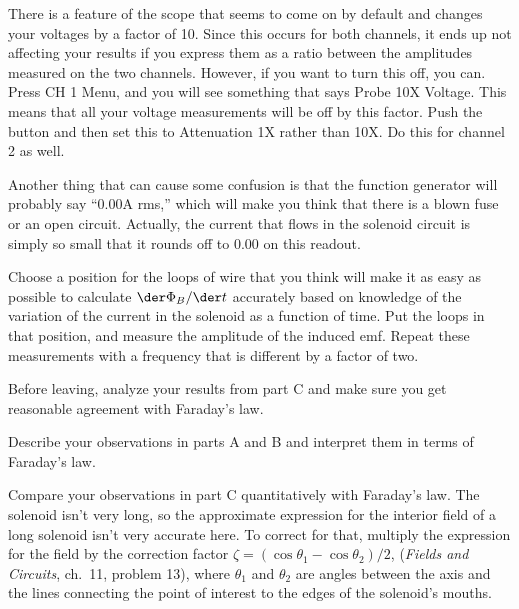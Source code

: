 There is a feature of the scope that seems to come on by
default and changes your voltages by a factor of 10. Since this
occurs for both channels, it ends up not affecting your results
if you express them as a ratio between the amplitudes measured
on the two channels. However, if you want to turn this off, you can.
Press CH 1 Menu, and you will see something that
says Probe 10X Voltage. This means that all your voltage measurements
will be off by this factor. Push the button and then set this to
Attenuation 1X rather than 10X. Do this for channel 2 as well.

Another thing that can cause some confusion is that the function generator
will probably say ``0.00A rms,'' which will make you think that there is
a blown fuse or an open circuit. Actually, the current that flows in the
solenoid circuit is simply so small that it rounds off to 0.00 on this
readout.

Choose a position for the loops of wire that
you think will make it as easy as possible to calculate $\der \Phi_B/\der t$
accurately based on knowledge of the variation of the
current in the solenoid as a function of time. Put the loops
in that position, and measure the amplitude of the induced
emf. Repeat these measurements with a frequency that
is different by a factor of two.

\selfcheck

Before leaving, analyze your results from part C and make
sure you get reasonable agreement with Faraday's law.

\analysis

Describe your observations in parts A and B and interpret
them in terms of Faraday's law.

Compare your observations in part C quantitatively with Faraday's law.
The solenoid isn't very long, so the approximate expression for the
interior field of a long solenoid isn't very accurate here. To correct
for that, multiply the expression for the field by the correction
factor $\zeta = (\cos\theta_1-\cos\theta_2)/2$,
(\emph{Fields and Circuits}, ch.~11, problem 13), where
$\theta_1$ and $\theta_2$ are angles between the axis and the lines connecting
the point of interest to the edges of the solenoid's mouths.

